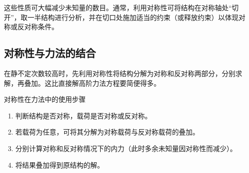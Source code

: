 这些性质可大幅减少未知量的数目。通常，利用对称性可将结构在对称轴处“切开”，取一半结构进行分析，并在切口处施加适当的约束（或释放约束）以体现对称或反对称条件。



\subsection{对称性与力法的结合}
在静不定次数较高时，先利用对称性将结构分解为对称和反对称两部分，分别求解，再叠加。这比直接解高阶力法方程要简便得多。

\begin{myhypothesis}{对称性在力法中的使用步骤}
    \begin{enumerate}
        \item 判断结构是否对称，载荷是否对称或反对称。
        \item 若载荷为任意，可将其分解为对称载荷与反对称载荷的叠加。
        \item 分别计算对称和反对称情况下的内力（此时多余未知量因对称性而减少）。
        \item 将结果叠加得到原结构的解。
    \end{enumerate}
\end{myhypothesis}

